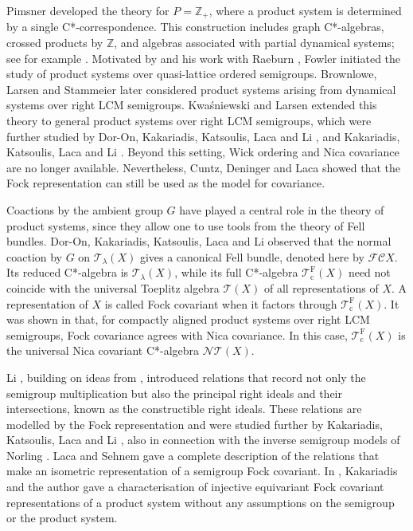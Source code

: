 \documentclass[11pt,final]{amsart}
\numberwithin{equation}{section}
\theoremstyle{plain}
\theoremstyle{definition}
\theoremstyle{remark}
\newcommand{\C}{{\mathcal{C}}}
\newcommand{\F}{{\mathcal{F}}}
\newcommand{\N}{{\mathcal{N}}}
\newcommand{\T}{{\mathcal{T}}}
\def\la{\lambda}
\newcommand{\bZ}{\mathbb{Z}}
\newcommand{\cov}{\operatorname{c}}
\newcommand{\fock}{\operatorname{F}}
\begin{document}
Pimsner \cite{Pim97} developed the theory for $P=\bZ_+$, where a product system is determined by a single C*-correspondence. This construction includes graph C*-algebras, crossed products by $\bZ$, and algebras associated with partial dynamical systems; see for example \cite{Kat03}. Motivated by \cite{Nic92,Pim97} and his work with Raeburn \cite{FR98}, Fowler \cite{Fow02} initiated the study of product systems over quasi-lattice ordered semigroups. Brownlowe, Larsen and Stammeier \cite{BLS18} later considered product systems arising from dynamical systems over right LCM semigroups. Kwa\'{s}niewski and Larsen \cite{KL19a,KL19b} extended this theory to general product systems over right LCM semigroups, which were further studied by Dor-On, Kakariadis, Katsoulis, Laca and Li \cite{DKKLL22}, and Kakariadis, Katsoulis, Laca and Li \cite{KKLL23}. Beyond this setting, Wick ordering and Nica covariance are no longer available. Nevertheless, Cuntz, Deninger and Laca \cite{CDL13} showed that the Fock representation can still be used as the model for covariance.

Coactions by the ambient group $G$ have played a central role in the theory of product systems, since they allow one to use tools from the theory of Fell bundles. Dor-On, Kakariadis, Katsoulis, Laca and Li \cite{DKKLL22} observed that the normal coaction by $G$ on $\T_\la(X)$ gives a canonical Fell bundle, denoted here by $\F\C X$. Its reduced C*-algebra is $\T_\la(X)$, while its full C*-algebra $\T_{\cov}^{\fock}(X)$ need not coincide with the universal Toeplitz algebra $\T(X)$ of all representations of $X$. A representation of $X$ is called Fock covariant when it factors through $\T_{\cov}^{\fock}(X)$. It was shown in \cite{DKKLL22} that, for compactly aligned product systems over right LCM semigroups, Fock covariance agrees with Nica covariance. In this case, $\T_{\cov}^{\fock}(X)$ is the universal Nica covariant C*-algebra $\N\T(X)$. 

Li \cite{Li12}, building on ideas from \cite{CDL13}, introduced relations that record not only the semigroup multiplication but also the principal right ideals and their intersections, known as the constructible right ideals. These relations are modelled by the Fock representation and were studied further by Kakariadis, Katsoulis, Laca and Li \cite{KKLL22}, also in connection with the inverse semigroup models of Norling \cite{Nor14}. Laca and Sehnem \cite{LS22} gave a complete description of the relations that make an isometric representation of a semigroup Fock covariant. In \cite{KP25}, Kakariadis and the author gave a characterisation of injective equivariant Fock covariant representations of a product system without any assumptions on the semigroup or the product system.
\end{document}
